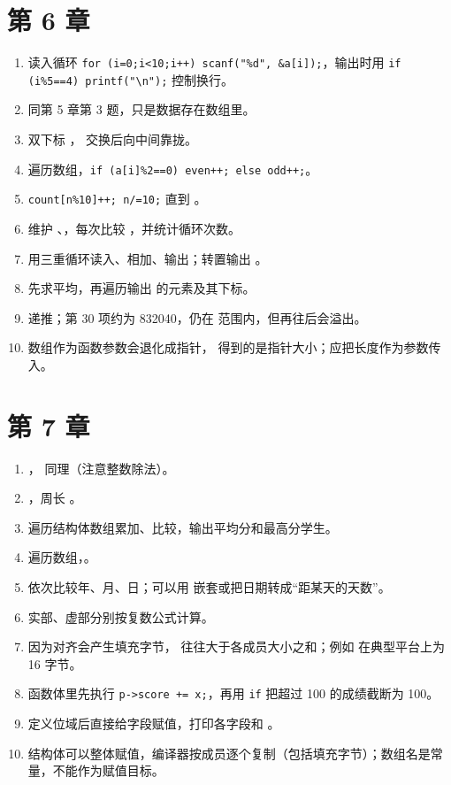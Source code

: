 \section{第 6 章}

\begin{enumerate}
  \item 读入循环 \texttt{for (i=0;i<10;i++) scanf("\%d", \&a[i]);}，输出时用 \texttt{if (i\%5==4) printf("\textbackslash n");} 控制换行。
  \item 同第 5 章第 3 题，只是数据存在数组里。
  \item 双下标 ， 交换后向中间靠拢。
  \item 遍历数组，\texttt{if (a[i]\%2==0) even++; else odd++;}。
  \item \texttt{count[n\%10]++; n/=10;} 直到 。
  \item 维护 、，每次比较 ，并统计循环次数。
  \item 用三重循环读入、相加、输出；转置输出 。
  \item 先求平均，再遍历输出  的元素及其下标。
  \item {} 递推；第 30 项约为 832040，仍在  范围内，但再往后会溢出。
  \item 数组作为函数参数会退化成指针， 得到的是指针大小；应把长度作为参数传入。
\end{enumerate}

\section{第 7 章}

\begin{enumerate}
  \item {}， 同理（注意整数除法）。
  \item {}，周长 。
  \item 遍历结构体数组累加、比较，输出平均分和最高分学生。
  \item 遍历数组，。
  \item 依次比较年、月、日；可以用  嵌套或把日期转成“距某天的天数”。
  \item 实部、虚部分别按复数公式计算。
  \item 因为对齐会产生填充字节， 往往大于各成员大小之和；例如  在典型平台上为 16 字节。
  \item 函数体里先执行 \texttt{p->score += x;}，再用 \texttt{if} 把超过 100 的成绩截断为 100。
  \item 定义位域后直接给字段赋值，打印各字段和 。
  \item 结构体可以整体赋值，编译器按成员逐个复制（包括填充字节）；数组名是常量，不能作为赋值目标。
\end{enumerate}

